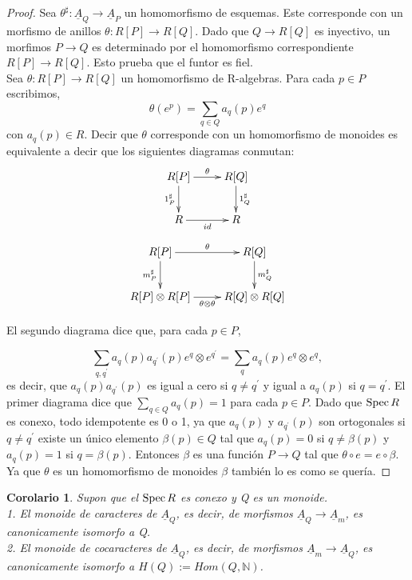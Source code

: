 \documentclass[12pt,spanish]{amsart}
\newcommand{\bb}[1]{\mathbb{#1}}
\newcommand{\sqrd}[8]{
 \xymatrix{%
 {#1} \ar[r]^-{#5}\ar[d]_-{#8} & {#2}\ar[d]^-{#6} \\ %
 {#4}\ar[r]_-{#7} & {#3} %
 }%
 } %
\def\Spec{\mathop{\mbox{\normalfont Spec}}\nolimits}
\newtheorem{cor}[Theorem]{Corolario}
\theoremstyle{definition}
\theoremstyle{remark}
\begin{document}
\begin{proof}
Sea $\theta^{\sharp}:\underline{A}_{Q} \to \underline{A}_{P}$ un homomorfismo de esquemas. Este corresponde con un morfismo de anillos $\theta:R[P] \to R[Q]$. Dado que $Q \to R[Q]$ es inyectivo, un morfimos $P\to Q$ es determinado por el homomorfismo correspondiente $R[P] \to R[Q]$. Esto prueba que el funtor es fiel. \\
Sea $\theta:R[P] \to R[Q]$ un homomorfismo de R-algebras. Para cada $p\in P$ escribimos,
$$\theta(e^{p})=\sum_{q\in Q}a_{q}(p)e^{q}$$
con $a_{q}(p)\in R$. Decir que $\theta$ corresponde con un homomorfismo de monoides es equivalente a decir que los siguientes diagramas conmutan:
$$\sqrd{R[P]}{R[Q]}{R}{R}{\theta}{1_{Q}^{\sharp}}{id}{1_{P}^{\sharp}}$$
$$\sqrd{R[P]}{R[Q]}{R[Q]\otimes R[Q]}{R[P]\otimes R[P]}{\theta}{m_{Q}^{\sharp}}{\theta \otimes \theta}{m_{P}^{\sharp}}$$

El segundo diagrama dice que, para cada $p\in P$,

$$\sum_{q,q^{\prime}}a_{q}(p)a_{q^{\prime}}(p)e^{q}\otimes e^{q^{\prime}}= \sum_{q}a_{q}(p)e^{q}\otimes e^{q},$$
es decir, que $a_{q}(p)a_{q^{\prime}}(p)$ es igual a cero si $q\neq q^{\prime}$ y igual a $a_{q}(p)$ si $q=q^{\prime}$. El primer diagrama dice que $\sum_{q\in Q}a_{q}(p)=1$ para cada $p\in P$. Dado que $\Spec{R}$ es conexo, todo idempotente es 0 o 1, ya que $a_{q}(p)$ y $a_{q^{ \prime}}(p)$ son ortogonales si $q\neq q^{\prime}$ existe un único elemento $\beta(p)\in Q$ tal que $a_{q}(p)=0$ si $q\neq \beta(p)$ y $a_{q}(p)=1$ si $q=\beta(p)$. Entonces $\beta$ es una función $P \to Q$ tal que $\theta \circ e = e \circ \beta$. Ya que $\theta$ es un homomorfismo de monoides $\beta$ también lo es como se quería.   
\end{proof}

\begin{cor}
Supon que el $\Spec{R}$ es conexo y Q es un monoide. \\ 
1. El monoide de caracteres de $\underline{A}_{Q}$, es decir, de morfismos $\underline{A}_{Q} \to \underline{A}_{m}$, es canonicamente isomorfo a Q. \\
2. El monoide de cocaracteres de $\underline{A}_{Q}$, es decir, de morfismos $\underline{A}_{m} \to \underline{A}_{Q}$, es canonicamente isomorfo a $H(Q):=Hom(Q,\bb{N})$.
\end{cor}
\end{document}
